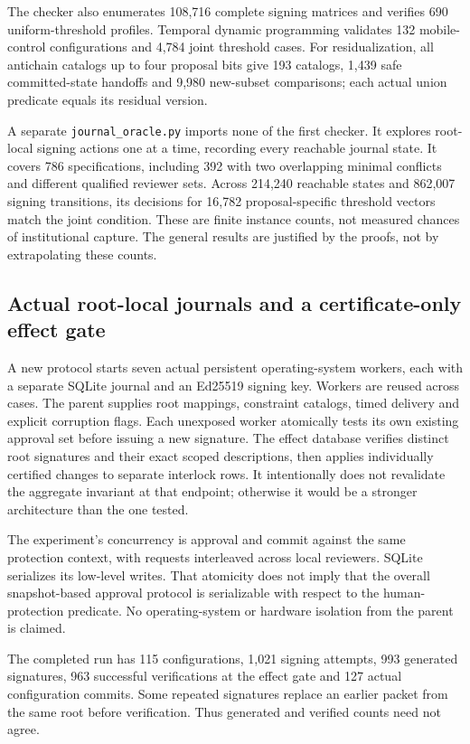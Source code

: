 \documentclass[11pt,a4paper]{article}
\theoremstyle{definition}\newtheorem{definition}{Definition}
\begin{document}
The checker also enumerates 108,716 complete signing matrices and verifies 690 uniform-threshold profiles. Temporal dynamic programming validates 132 mobile-control configurations and 4,784 joint threshold cases. For residualization, all antichain catalogs up to four proposal bits give 193 catalogs, 1,439 safe committed-state handoffs and 9,980 new-subset comparisons; each actual union predicate equals its residual version.

A separate \texttt{journal\_oracle.py} imports none of the first checker. It explores root-local signing actions one at a time, recording every reachable journal state. It covers 786 specifications, including 392 with two overlapping minimal conflicts and different qualified reviewer sets. Across 214,240 reachable states and 862,007 signing transitions, its decisions for 16,782 proposal-specific threshold vectors match the joint condition. These are finite instance counts, not measured chances of institutional capture. The general results are justified by the proofs, not by extrapolating these counts.

\subsection{Actual root-local journals and a certificate-only effect gate}
A new protocol starts seven actual persistent operating-system workers, each with a separate SQLite journal and an Ed25519 signing key. Workers are reused across cases. The parent supplies root mappings, constraint catalogs, timed delivery and explicit corruption flags. Each unexposed worker atomically tests its own existing approval set before issuing a new signature. The effect database verifies distinct root signatures and their exact scoped descriptions, then applies individually certified changes to separate interlock rows. It intentionally does not revalidate the aggregate invariant at that endpoint; otherwise it would be a stronger architecture than the one tested.

The experiment's concurrency is approval and commit against the same protection context, with requests interleaved across local reviewers. SQLite serializes its low-level writes. That atomicity does not imply that the overall snapshot-based approval protocol is serializable with respect to the human-protection predicate. No operating-system or hardware isolation from the parent is claimed.

The completed run has 115 configurations, 1,021 signing attempts, 993 generated signatures, 963 successful verifications at the effect gate and 127 actual configuration commits. Some repeated signatures replace an earlier packet from the same root before verification. Thus generated and verified counts need not agree.
\end{document}
